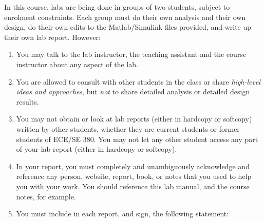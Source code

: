 In this course, labs are being done in groups of two students, subject to enrolment constraints. Each group must do their own analysis and their own design, do their own edits to the Matlab/Simulink files provided, and write up their own lab report. However:
\begin{enumerate}
\item{You may talk to the lab instructor, the teaching assistant and the course instructor about any aspect of the lab.}
\item{You are allowed to consult with other students in the class or share \emph{high-level ideas and approaches}, but \emph{not} to share detailed analysis or detailed design results.}
\item{You may not obtain or look at lab reports (either in hardcopy or softcopy) written by other students, whether they are current students or former students of ECE/SE 380. You may not let any other student access any part of your lab report (either in hardcopy or softcopy).}
\item{In your report, you must completely and unambiguously acknowledge and reference any person, website, report, book, or notes that you used to help you with your work. You should reference this lab manual, and the course notes, for example.}
\item{You must include in each report, and sign, the following statement:}
\end{enumerate}


